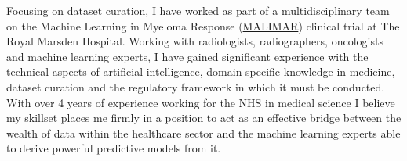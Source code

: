 %
%
%
\par{

Focusing on dataset curation, I have worked as part of a multidisciplinary team on the Machine Learning in Myeloma Response \newline
({\color{linkcolor}\href{https://fundingawards.nihr.ac.uk/award/16/68/34}{MALIMAR}}) clinical trial at The Royal Marsden Hospital.
Working with radiologists, radiographers, oncologists and machine learning \newline experts, I have gained significant experience with the technical aspects of artificial intelligence, domain specific knowledge in \newline medicine, dataset curation and the regulatory framework in which it must be conducted.
With over 4 years of experience working for the NHS in medical science I believe my skillset places me firmly in a position to act as an effective bridge between the wealth of data within the healthcare sector and the machine learning experts able to derive powerful predictive models from it.

}


